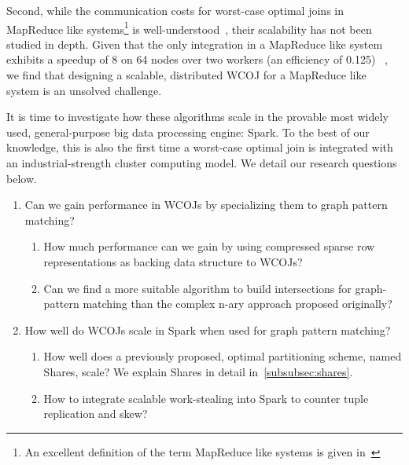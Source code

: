Second, while the communication costs for worst-case optimal joins in MapReduce like systems\footnote{
An excellent definition of the term MapReduce like systems is given in~\cite{shares}}
is well-understood~\cite{shares,shares-skew,shares-proof,shares-skew-proof},
their scalability has not been studied in depth.
Given that the only integration in a MapReduce like system exhibits a speedup of 8 on 64 nodes over two workers (an efficiency of 0.125)
~\cite{myria-detailed},
we find that designing a scalable, distributed \textsc{WCOJ} for a MapReduce like system is an unsolved challenge.

It is time to investigate how these algorithms scale in the provable most widely used, general-purpose big data processing engine: Spark.
To the best of our knowledge, this is also the first time a worst-case optimal join is integrated with an industrial-strength cluster
computing model.
We detail our research questions below.

\begin{enumerate}
    \item Can we gain performance in \textsc{WCOJ}s by specializing them to graph pattern matching?
    \begin{enumerate}
        \item How much performance can we gain by using compressed sparse row representations as backing data structure to \textsc{WCOJ}s?
        \item Can we find a more suitable algorithm to build intersections for graph-pattern matching than the complex n-ary approach
         proposed originally?
    \end{enumerate}
    \item How well do \textsc{WCOJ}s scale in Spark when used for graph pattern matching?
    \begin{enumerate}
        \item How well does a previously proposed, optimal partitioning scheme, named Shares, scale?
          We explain Shares in detail in~\cref{subsubsec:shares}.
        \item How to integrate scalable work-stealing into Spark to counter tuple replication and skew?
    \end{enumerate}
\end{enumerate}

